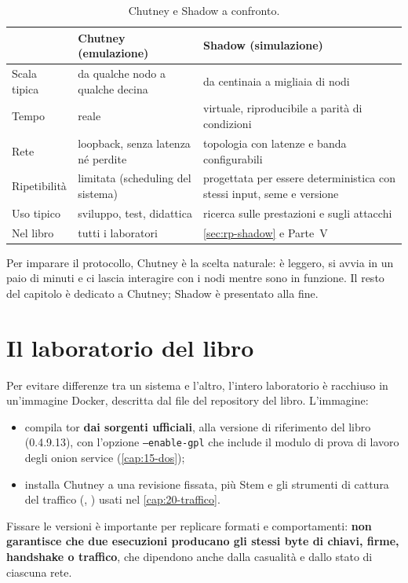 \begin{table}[htbp]
\centering\small
\begin{tabularx}{\textwidth}{@{}l>{\raggedright\arraybackslash}X>{\raggedright\arraybackslash}X@{}}
\toprule
 & Chutney (emulazione) & Shadow (simulazione) \\
\midrule
Scala tipica & da qualche nodo a qualche decina & da centinaia a migliaia di nodi \\
Tempo & reale & virtuale, riproducibile a parità di condizioni \\
Rete & loopback, senza latenza né perdite & topologia con latenze e banda configurabili \\
Ripetibilità & limitata (scheduling del sistema) & progettata per essere deterministica con stessi input, seme e versione \\
Uso tipico & sviluppo, test, didattica & ricerca sulle prestazioni e sugli attacchi \\
Nel libro & tutti i laboratori & \cref{sec:rp-shadow} e Parte~V \\
\bottomrule
\end{tabularx}
\caption{Chutney e Shadow a confronto.}
\label{tab:chutney-shadow}
\end{table}

Per imparare il protocollo, Chutney è la scelta naturale: è leggero, si avvia in un paio di minuti e ci lascia interagire con i nodi mentre sono in funzione. Il resto del capitolo è dedicato a Chutney; Shadow è presentato alla fine.

\section{Il laboratorio del libro}\label{sec:rp-avvio}

Per evitare differenze tra un sistema e l'altro, l'intero laboratorio è racchiuso in un'immagine Docker, descritta dal file  del repository del libro. L'immagine:
\begin{itemize}
  \item compila tor \textbf{dai sorgenti ufficiali}, alla versione di riferimento del libro (0.4.9.13), con l'opzione \texttt{--enable-gpl} che include il modulo di prova di lavoro degli onion service (\cref{cap:15-dos});
  \item installa Chutney a una revisione fissata, più Stem e gli strumenti di cattura del traffico (, ) usati nel \cref{cap:20-traffico}.
\end{itemize}
Fissare le versioni è importante per replicare formati e comportamenti: \textbf{non garantisce che due esecuzioni producano gli stessi byte di chiavi, firme, handshake o traffico}, che dipendono anche dalla casualità e dallo stato di ciascuna rete.

